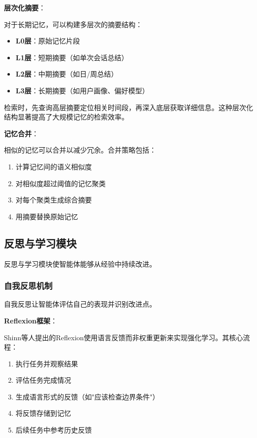 \textbf{层次化摘要}：

对于长期记忆，可以构建多层次的摘要结构：
\begin{itemize}[leftmargin=2em]
    \item \textbf{L0层}：原始记忆片段
    \item \textbf{L1层}：短期摘要（如单次会话总结）
    \item \textbf{L2层}：中期摘要（如日/周总结）
    \item \textbf{L3层}：长期摘要（如用户画像、偏好模型）
\end{itemize}

检索时，先查询高层摘要定位相关时间段，再深入底层获取详细信息。这种层次化结构显著提高了大规模记忆的检索效率。

\textbf{记忆合并}：

相似的记忆可以合并以减少冗余。合并策略包括：
\begin{enumerate}[leftmargin=2em]
    \item 计算记忆间的语义相似度
    \item 对相似度超过阈值的记忆聚类
    \item 对每个聚类生成综合摘要
    \item 用摘要替换原始记忆
\end{enumerate}

\subsection{反思与学习模块}

反思与学习模块使智能体能够从经验中持续改进。

\subsubsection{自我反思机制}

自我反思让智能体评估自己的表现并识别改进点。

\textbf{Reflexion框架}：

Shinn等人\cite{shinn2023reflexion}提出的Reflexion使用语言反馈而非权重更新来实现强化学习。其核心流程：

\begin{enumerate}[leftmargin=2em]
    \item 执行任务并观察结果
    \item 评估任务完成情况
    \item 生成语言形式的反馈（如"应该检查边界条件"）
    \item 将反馈存储到记忆
    \item 后续任务中参考历史反馈
\end{enumerate}

